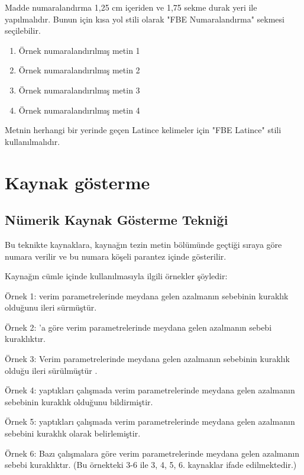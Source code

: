 Madde numaralandırma 1,25 cm içeriden ve 1,75 sekme durak yeri ile yapılmalıdır. Bunun için kısa yol stili olarak "FBE Numaralandırma" sekmesi seçilebilir.
\begin{enumerate}
	\setlength{\itemindent}{1.25cm}
	\item Örnek numaralandırılmış metin 1
	\item Örnek numaralandırılmış metin 2
	\item Örnek numaralandırılmış metin 3
	\item Örnek numaralandırılmış metin 4
\end{enumerate}

Metnin herhangi bir yerinde geçen Latince kelimeler için "FBE Latince" stili kullanılmalıdır.


\section{Kaynak gösterme}

\subsection{Nümerik Kaynak Gösterme Tekniği}
\noindent Bu teknikte kaynaklara, kaynağın tezin metin bölümünde geçtiği sıraya göre numara verilir ve bu numara köşeli parantez içinde gösterilir.

Kaynağın cümle içinde kullanılmasıyla ilgili örnekler şöyledir:

	Örnek 1: \citet{Olekseyuk2002} verim parametrelerinde meydana gelen azalmanın sebebinin kuraklık olduğunu ileri sürmüştür.

	Örnek 2: \citet{Olekseyuk2002}'a göre verim parametrelerinde meydana gelen azalmanın sebebi kuraklıktır.

	Örnek 3: Verim parametrelerinde meydana gelen azalmanın sebebinin kuraklık olduğu ileri sürülmüştür \parencite{Olekseyuk2002,Kovnir2013}.

	Örnek 4: \citet{Yoo2010} yaptıkları çalışmada verim parametrelerinde meydana gelen azalmanın sebebinin 
	kuraklık olduğunu bildirmiştir.
	
	Örnek 5: \citet{Sakamoto2005} yaptıkları çalışmada verim parametrelerinde meydana gelen azalmanın sebebini kuraklık olarak belirlemiştir.
	
	Örnek 6: Bazı çalışmalara \parencite{Olekseyuk2002,Yoo2010,Sakamoto2005,Hai-Jun2010,Thompson2014} göre verim parametrelerinde meydana gelen azalmanın sebebi kuraklıktır. (Bu örnekteki 3-6 ile 3, 4, 5, 6. kaynaklar ifade edilmektedir.)
	
